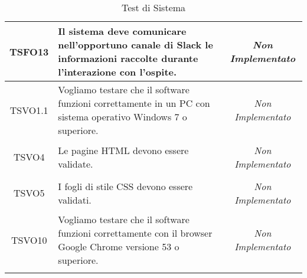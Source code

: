 \begin{longtable}{|c|>{}m{8cm}|c|}
	\hypertarget{TSFO13}{TSFO13} & Il sistema deve comunicare nell'opportuno canale di Slack le informazioni raccolte durante l'interazione con l'ospite. & \textit{Non Implementato}\\ \hline
	\hypertarget{TSVO1.1}{TSVO1.1} & Vogliamo testare che il software funzioni correttamente in un PC con sistema operativo Windows 7 o superiore.
	& \textit{Non Implementato}\\ \hline
	\hypertarget{TSVO4}{TSVO4} & Le pagine HTML devono essere validate. & \textit{Non Implementato}\\ \hline
	\hypertarget{TSVO5}{TSVO5} & I fogli di stile CSS devono essere validati. & \textit{Non Implementato}\\ \hline
	\hypertarget{TSVO10}{TSVO10} & Vogliamo testare che il software funzioni correttamente con il browser Google Chrome versione 53 o superiore. & \textit{Non Implementato}\\ \hline
	\caption[Test di Sistema]{Test di Sistema}
	\label{tabella:test1}
\end{longtable}
\clearpage

